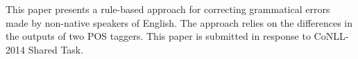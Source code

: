 This paper presents a rule-based approach for correcting grammatical errors made by non-native speakers of English. The approach relies on the differences in the outputs of two POS taggers. This paper is submitted in response to CoNLL-2014 Shared Task.
